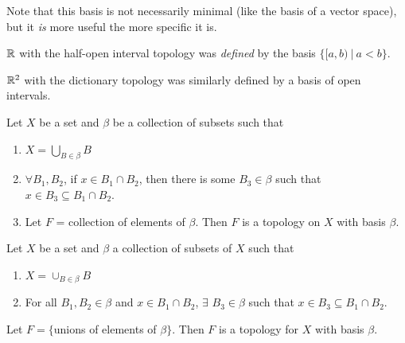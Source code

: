 Note that this basis is not necessarily minimal (like the basis of a vector space), but it {\it is} more useful the more specific it is.
\begin{example}
	$\mathbb R$ with the half-open interval topology was {\it defined} by the basis $\big\{ [a, b)\ |\ a < b\big\}$. 
\end{example}
\begin{example}
	$\mathbb R^2$ with the dictionary topology was similarly defined by a basis of open intervals. 
\end{example}
\begin{theorem}
	Let $X$ be a set and $\beta$ be a collection of subsets such that 
	\begin{enumerate}
		\item $X = \bigcup_{B\in \beta} B$ 
		\item $\forall B_1, B_2$, if $x\in B_1\cap B_2$, then there is some $B_3\in\beta$ such that $x\in B_3\subseteq B_1\cap B_2$. 
		\item Let $F$ = collection of elements of $\beta$. Then $F$ is a topology on $X$ with basis $\beta$. 
	\end{enumerate}
\end{theorem}
\begin{theorem}
	Let $X$ be a set and $\beta$ a collection of subsets of $X$ such that 
	\begin{enumerate}
		\item $X = \cup_{B \in \beta} B$ 
		\item For all $B_1, B_2 \in \beta$ and $x \in B_1 \cap B_2$, $\exists$ $B_3 \in \beta$ such that $x \in B_3 \subseteq B_1 \cap B_2$. 
	\end{enumerate}
	Let $F = \{$unions of elements of $\beta \}$. Then $F$ is a topology for $X$ with basis $\beta$. 
\end{theorem}
